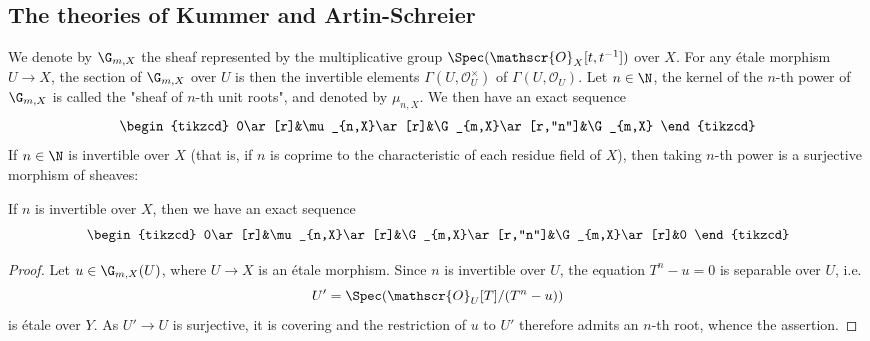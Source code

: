 \subsection{The theories of Kummer and Artin-Schreier}
We denote by $\G_{m,X}$ the sheaf represented by the multiplicative group $\Spec(\mathscr{O}_X[t,t^{-1}])$ over $X$. For any \'etale morphism $U\to X$, the section of $\G_{m,X}$ over $U$ is then the invertible elements $\Gamma(U,\mathscr{O}_U^\times)$ of $\Gamma(U,\mathscr{O}_U)$. Let $n\in\N$, the kernel of the $n$-th power of $\G_{m,X}$ is called the "sheaf of $n$-th unit roots", and denoted by $\mu_{n,X}$. We then have an exact sequence
\begin{equation}\label{scheme etale Kummer exact sequence-1}
\begin{tikzcd}
0\ar[r]&\mu_{n,X}\ar[r]&\G_{m,X}\ar[r,"n"]&\G_{m,X}  
\end{tikzcd}
\end{equation}
If $n\in\N$ is invertible over $X$ (that is, if $n$ is coprime to the characteristic of each residue field of $X$), then taking $n$-th power is a surjective morphism of sheaves:
\begin{theorem}\label{scheme etale Kummer exact sequence}
If $n$ is invertible over $X$, then we have an exact sequence
\begin{equation}\label{scheme etale Kummer exact sequence-2}
\begin{tikzcd}
0\ar[r]&\mu_{n,X}\ar[r]&\G_{m,X}\ar[r,"n"]&\G_{m,X}\ar[r]&0
\end{tikzcd}
\end{equation}
\end{theorem}
\begin{proof}
Let $u\in\G_{m,X}(U)$, where $U\to X$ is an \'etale morphism. Since $n$ is invertible over $U$, the equation $T^n-u=0$ is separable over $U$, i.e.
\[U'=\Spec(\mathscr{O}_U[T]/(T^n-u))\]
is \'etale over $Y$. As $U'\to U$ is surjective, it is covering and the restriction of $u$ to $U'$ therefore admits an $n$-th root, whence the assertion.
\end{proof}

